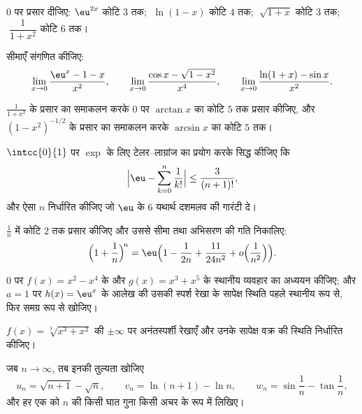 \begin{exercise}[$\star$]\label{exo:b1:taylor:1}
$0$ पर प्रसार दीजिए: $\eu^{2x}$ कोटि $3$ तक; $\;\ln(1 - x)$ कोटि $4$ तक;
$\;\sqrt{1 + x}$ कोटि $3$ तक; $\;\dfrac{1}{1 + x^2}$ कोटि $6$ तक।
\end{exercise}

\begin{exercise}[$\star$]\label{exo:b1:taylor:2}
सीमाएँ संगणित कीजिए:
\[
\lim_{x\to 0} \frac{\eu^x - 1 - x}{x^2},
\qquad
\lim_{x\to 0} \frac{\cos x - \sqrt{1 - x^2}}{x^4},
\qquad
\lim_{x\to 0} \frac{\ln(1+x) - \sin x}{x^2}.
\]
\end{exercise}

\begin{exercise}[$\star$]\label{exo:b1:taylor:3}
$\frac{1}{1 + x^2}$ के प्रसार का समाकलन करके $0$ पर $\arctan x$ का कोटि $5$
तक प्रसार कीजिए, और $(1 - x^2)^{-1/2}$ के प्रसार का समाकलन करके $\arcsin x$
का कोटि $5$ तक।
\end{exercise}

\begin{exercise}[$\star$]\label{exo:b1:taylor:4}
$\intcc{0}{1}$ पर $\exp$ के लिए टेलर--लाग्रांज का प्रयोग करके सिद्ध कीजिए कि
\[
\Bigl| \eu - \sum_{k=0}^{n} \frac{1}{k!} \Bigr| \leq
\frac{3}{(n+1)!},
\]
और ऐसा $n$ निर्धारित कीजिए जो $\eu$ के $6$ यथार्थ दशमलव की गारंटी दे।
\end{exercise}

\begin{exercise}[$\star\star$]\label{exo:b1:taylor:5}
$\frac1n$ में कोटि $2$ तक प्रसार कीजिए और उससे सीमा तथा अभिसरण की गति
निकालिए:
\[
\Bigl(1 + \frac 1n\Bigr)^{\!n}
= \eu\Bigl(1 - \frac{1}{2n} + \frac{11}{24n^2} +
o\Bigl(\frac{1}{n^2}\Bigr)\Bigr).
\]
\end{exercise}

\begin{exercise}[$\star\star$]\label{exo:b1:taylor:6}
$0$ पर $f(x) = x^2 - x^4$ के और $g(x) = x^3 + x^5$ के स्थानीय व्यवहार का
अध्ययन कीजिए; और $a = 1$ पर $h(x) = \eu^x$ के आलेख की उसकी स्पर्श रेखा के
सापेक्ष स्थिति पहले स्थानीय रूप से, फिर समग्र रूप से खोजिए।
\end{exercise}

\begin{exercise}[$\star\star$]\label{exo:b1:taylor:7}
$f(x) = \sqrt[3]{x^3 + x^2}$ की $\pm\infty$ पर अनंतस्पर्शी रेखाएँ और उनके
सापेक्ष वक्र की स्थिति निर्धारित कीजिए।
\end{exercise}

\begin{exercise}[$\star\star$]\label{exo:b1:taylor:8}
जब $n \to \infty$, तब इनकी तुल्यता खोजिए
\[
u_n = \sqrt{n+1} - \sqrt n, \qquad
v_n = \ln(n+1) - \ln n, \qquad
w_n = \sin\frac{1}{n} - \tan\frac{1}{n},
\]
और हर एक को $n$ की किसी घात गुना किसी अचर के रूप में लिखिए।
\end{exercise}

